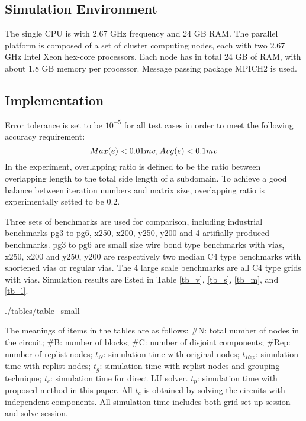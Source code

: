 \documentclass{sig-alternate}
\begin{document}
  \subsection{Simulation Environment}
	The single CPU is with 2.67 GHz frequency and 24 GB RAM. The parallel platform is composed of a set of cluster 
	computing nodes, each with two 2.67 GHz Intel Xeon hex-core processors. Each node has in total 24 GB of RAM, with about 
	1.8 GB memory per processor. Message passing package MPICH2 is used.  
  \subsection{Implementation}
	Error tolerance is set to be $10^{-5}$ for all test cases in order to meet the following accuracy requirement:
	\begin{equation}
		Max(e) < 0.01 mv, Avg(e) < 0.1 mv\\ \label{eq_err}
	\end{equation}
	In the experiment, overlapping ratio is defined to be the ratio between overlapping length to the total side length of 
	a subdomain. To achieve a good balance between iteration numbers and matrix size, overlapping ratio is experimentally 
	setted to be 0.2.
			
	Three sets of benchmarks are used for comparison, including 
	industrial benchmarks pg3 to pg6, x250, x200, y250, y200 and 4 artifially produced benchmarks. pg3 to pg6 are 
	small size wire bond type benchmarks with vias, x250, x200 and y250, y200 are respectively two median C4 type benchmarks with
	shortened vias or regular vias. The 4 large scale benchmarks are all C4 type grids with vias. Simulation results are 
	listed in Table \ref{tb_v}, \ref{tb_s}, \ref{tb_m}, and \ref{tb_l}.
	\begin{table}[h]
	   \label{tb_v}
  	   {./tables/table_small} \label{tb_s}
	\end{table}
	\begin{table}[h]
  	   \label{tb_m}
  	   \label{tb_l}
	\end{table}

	The meanings of items in the tables are as follows: \#N: total number of nodes in the circuit; 
	\#B: number of blocks; \#C: number of disjoint components; \#Rep: number of replist nodes; 
  	$t_N$: simulation time with original nodes; $t_{Rep}$: simulation time with replist nodes; 
	$t_g$: simulation time with replist nodes and grouping technique; $t_c$: simulation time for direct LU solver. 
	$t_p$: simulation time with proposed method in this paper.  
	All $t_c$ is obtained by solving the circuits with independent components. All 
	simulation time includes both grid set up session and solve session.
\end{document}

